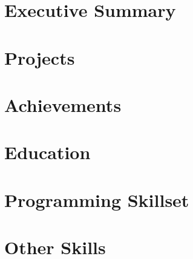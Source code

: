\documentclass[12pt, a4paper, sans, obeyspaces, unicode]{moderncv}
\begin{document}
\maketitle

\vspace{0.5cm}

\section{Executive Summary}
    
\section{Projects}

    
    
\section{Achievements}
    

\section{Education}

    

\section{Programming Skillset}

    
\section{Other Skills}
    
\end{document}
